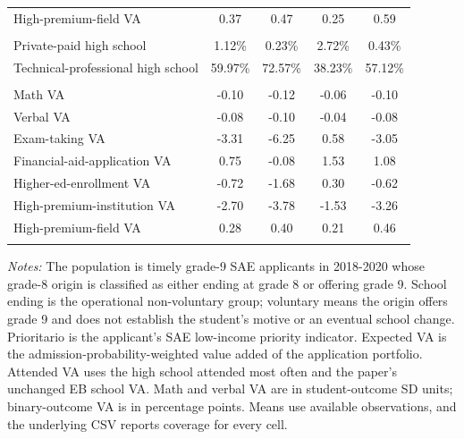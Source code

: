 \begin{table}[!htbp]
{\begin{tabular}{lcccc}
High-premium-field VA & 0.37 & 0.47 & 0.25 & 0.59 \\
\addlinespace
\multicolumn{5}{l}{\textit{High school attended}} \\
Private-paid high school & 1.12\% & 0.23\% & 2.72\% & 0.43\% \\
Technical-professional high school & 59.97\% & 72.57\% & 38.23\% & 57.12\% \\
\addlinespace
\multicolumn{5}{l}{\textit{Attended-school value added}} \\
Math VA & -0.10 & -0.12 & -0.06 & -0.10 \\
Verbal VA & -0.08 & -0.10 & -0.04 & -0.08 \\
Exam-taking VA & -3.31 & -6.25 & 0.58 & -3.05 \\
Financial-aid-application VA & 0.75 & -0.08 & 1.53 & 1.08 \\
Higher-ed-enrollment VA & -0.72 & -1.68 & 0.30 & -0.62 \\
High-premium-institution VA & -2.70 & -3.78 & -1.53 & -3.26 \\
High-premium-field VA & 0.28 & 0.40 & 0.21 & 0.46 \\
\addlinespace
\bottomrule
\end{tabular}
}
\par\medskip\footnotesize
\begin{minipage}{\textwidth}
\textit{Notes:} The population is timely grade-9 SAE applicants in 2018-2020 whose grade-8 origin is classified as either ending at grade 8 or offering grade 9. School ending is the operational non-voluntary group; voluntary means the origin offers grade 9 and does not establish the student's motive or an eventual school change. Prioritario is the applicant's SAE low-income priority indicator. Expected VA is the admission-probability-weighted value added of the application portfolio. Attended VA uses the high school attended most often and the paper's unchanged EB school VA. Math and verbal VA are in student-outcome SD units; binary-outcome VA is in percentage points. Means use available observations, and the underlying CSV reports coverage for every cell.
\end{minipage}
\end{table}
